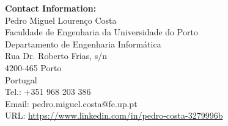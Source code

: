 \noindent\textbf{Contact Information:} \\

\noindent Pedro Miguel Lourenço Costa \\
Faculdade de Engenharia da Universidade do Porto \\
Departamento de Engenharia Informática \\

\noindent Rua Dr. Roberto Frias, s/n \\
4200-465 Porto \\
Portugal \\

\noindent Tel.: +351 968 203 386 \\
Email: pedro.miguel.costa@fe.up.pt \\
URL: \url{https://www.linkedin.com/in/pedro-costa-3279996b} \\

\vfill

